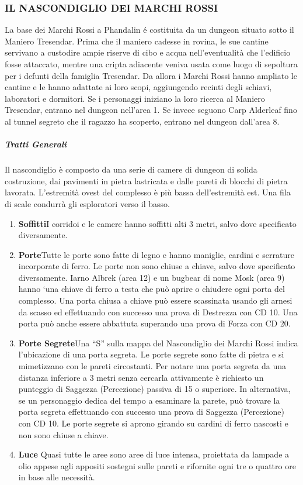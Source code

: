 \documentclass{article}
\begin{document}
\subsubsection{IL NASCONDIGLIO
DEI MARCHI ROSSI}
La base dei Marchi Rossi a Phandalin é costituita da un
dungeon situato sotto il Maniero Tresendar. Prima che
il maniero cadesse in rovina, le sue cantine servivano a
custodire ampie riserve di cibo e acqua nell'eventualità che
l’edificio fosse attaccato, mentre una cripta adiacente veniva
usata come luogo di sepoltura per i defunti della famiglia
Tresendar. Da allora i Marchi Rossi hanno ampliato le
cantine e le hanno adattate ai loro scopi, aggiungendo recinti
degli schiavi, laboratori e dormitori.
Se i personaggi iniziano la loro ricerca al Maniero
Tresendar, entrano nel dungeon nell’area 1. Se invece
seguono Carp Alderleaf fino al tunnel segreto che il ragazzo
ha scoperto, entrano nel dungeon dall'area 8.
\subparagraph{Tratti Generali}
\hypertarget{trattigen}{}
Il nascondiglio è composto da una serie di camere di dungeon
di solida costruzione, dai pavimenti in pietra lastricata e
dalle pareti di blocchi di pietra lavorata. L'estremità ovest
del complesso è più bassa dell’estremità est. Una fila di scale
condurrà gli esploratori verso il basso.
\begin{enumerate}
    \item \textbf{Soffitti}I corridoi e le camere hanno soffitti alti 3 metri,
salvo dove specificato diversamente.
    \item \textbf{Porte}Tutte le porte sono fatte di legno e hanno maniglie,
cardini e serrature incorporate di ferro. Le porte non sono
chiuse a chiave, salvo dove specificato diversamente. Iarno
Albrek (area 12) e un bugbear di nome Mosk (area 9) hanno
‘una chiave di ferro a testa che può aprire o chiudere ogni
porta del complesso.
Una porta chiusa a chiave può essere scassinata usando
gli arnesi da scasso ed effettuando con successo una prova di
Destrezza con CD 10. Una porta può anche essere abbattuta
superando una prova di Forza con CD 20.
\item \textbf{Porte Segrete}Una “S” sulla mappa del Nascondiglio dei
Marchi Rossi indica l'ubicazione di una porta segreta.
Le porte segrete sono fatte di pietra e si mimetizzano con
le pareti circostanti. Per notare una porta segreta da una
distanza inferiore a 3 metri senza cercarla attivamente è
richiesto un punteggio di Saggezza (Percezione) passiva di
15 o superiore. In alternativa, se un personaggio dedica del
tempo a esaminare la parete, può trovare la porta segreta
effettuando con successo una prova di Saggezza (Percezione)
con CD 10. Le porte segrete si aprono girando su cardini di
ferro nascosti e non sono chiuse a chiave.
\item \textbf{Luce} Quasi tutte le aree sono aree di luce intensa, proiettata
da lampade a olio appese agli appositi sostegni sulle pareti e
rifornite ogni tre o quattro ore in base alle necessità.
\end{enumerate}
\end{document}
